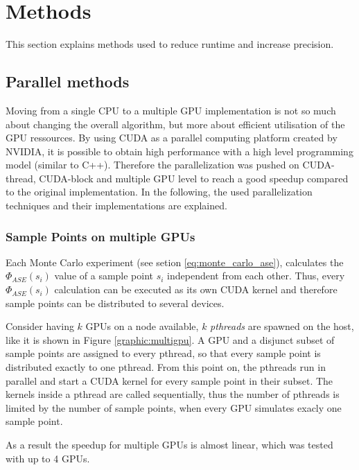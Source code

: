 \section{Methods}
This section explains methods used to reduce runtime and
increase precision.

\subsection{Parallel methods}
\label{subsec:parallel_methods}
Moving from a single CPU to a multiple
GPU implementation is not so much about changing the overall algorithm,
but more about efficient utilisation of the GPU ressources. 
By using CUDA as a parallel computing platform created by NVIDIA,
it is possible to obtain high performance with a high level 
programming model (similar to C++). Therefore the parallelization was pushed on CUDA-thread, 
CUDA-block and multiple GPU level to reach a good speedup compared to 
the original implementation.
In the following, the used parallelization
techniques and their implementations are explained.

\subsubsection{Sample Points on multiple GPUs}
\label{subsubsec:multigpu}

Each Monte Carlo experiment (see setion \ref{eq:monte_carlo_ase}), calculates the $\Phi_{ASE}(s_i)$ 
value of a sample point $s_i$ independent from each other.
Thus, every $\Phi_{ASE}(s_i)$ calculation can be executed as its own CUDA kernel
and therefore sample points can be distributed to several devices.

Consider having $k$ GPUs on a node available, 
$k$ \emph{pthreads} are spawned on the host, like it
is shown in Figure \ref{graphic:multigpu}. A GPU and a
disjunct subset of sample points are assigned to every pthread, so that every
sample point is distributed exactly to one pthread.
From this point on, the pthreads run in parallel and start a
CUDA kernel for every sample point in their subset.
The kernels inside a pthread are called sequentially,
thus the number of pthreads is limited by the number of sample points, when 
every GPU simulates exacly one sample point.

As a result the speedup for multiple
GPUs is almost linear, which was tested with up to 4 GPUs.
    
